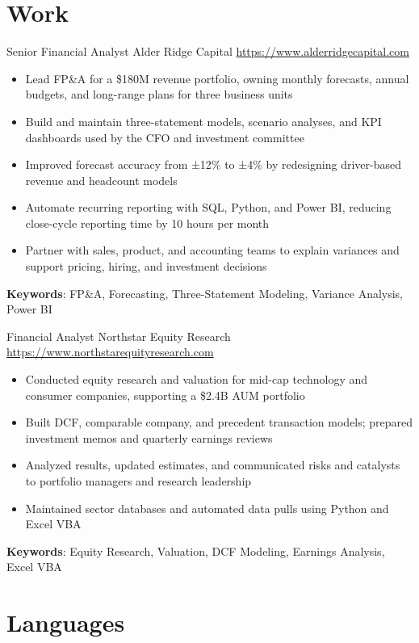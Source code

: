 \documentclass[a4paper, serif, 10pt]{moderncv}
\begin{document}
\section{Work}

        {Senior Financial Analyst}
        {Alder Ridge Capital}
        {\url{https://www.alderridgecapital.com}}
        {}
        {\begin{itemize}
\item Lead FP\&A for a \$180M revenue portfolio, owning monthly forecasts, annual budgets, and long-range plans for three business units
\item Build and maintain three-statement models, scenario analyses, and KPI dashboards used by the CFO and investment committee
\item Improved forecast accuracy from ±12\% to ±4\% by redesigning driver-based revenue and headcount models
\item Automate recurring reporting with SQL, Python, and Power BI, reducing close-cycle reporting time by 10 hours per month
\item Partner with sales, product, and accounting teams to explain variances and support pricing, hiring, and investment decisions
\end{itemize}
\textbf{Keywords}: FP\&A, Forecasting, Three-Statement Modeling, Variance Analysis, Power BI}

        {Financial Analyst}
        {Northstar Equity Research}
        {\url{https://www.northstarequityresearch.com}}
        {}
        {\begin{itemize}
\item Conducted equity research and valuation for mid-cap technology and consumer companies, supporting a \$2.4B AUM portfolio
\item Built DCF, comparable company, and precedent transaction models; prepared investment memos and quarterly earnings reviews
\item Analyzed results, updated estimates, and communicated risks and catalysts to portfolio managers and research leadership
\item Maintained sector databases and automated data pulls using Python and Excel VBA
\end{itemize}
\textbf{Keywords}: Equity Research, Valuation, DCF Modeling, Earnings Analysis, Excel VBA}
\section{Languages}
\end{document}
